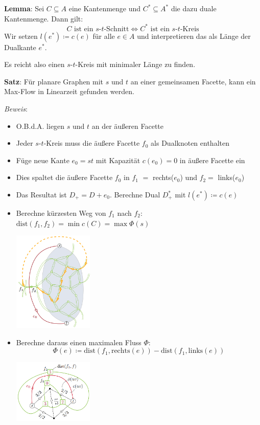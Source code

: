 \textbf{Lemma}: Sei $C\subseteq A$ eine Kantenmenge und $C^*\subseteq A^*$ die dazu duale Kantenmenge. Dann gilt:
$$C \text{ ist ein }s\text{-}t\text{-Schnitt}\iff C^* \text{ ist ein }s\text{-}t\text{-Kreis}$$
Wir setzen $l(e^*)\coloneqq c(e)$ für alle $e\in A$ und interpretieren das als Länge der Dualkante $e^*$.

Es reicht also einen $s$-$t$-Kreis mit minimaler Länge zu finden. 

\textbf{Satz}: Für planare Graphen mit $s$ und $t$ an einer gemeinsamen Facette, kann ein Max-Flow in Linearzeit gefunden werden.

\textit{Beweis}:
\begin{itemize}
	\item O.B.d.A. liegen $s$ und $t$ an der äußeren Facette
	\item Jeder $s$-$t$-Kreis muss die äußere Facette $f_0$ als Dualknoten enthalten
	\item Füge neue Kante $e_0=st$ mit Kapazität $c(e_0)=0$ in äußere Facette ein
	\item Dies spaltet die äußere Facette $f_0$ in $f_1$ $=$ rechts($e_0$) und $f_2 =$ links($e_0$)
	\item Das Resultat ist $D_+=D+e_0$. Berechne Dual $D_+^*$ mit $l(e^*)\coloneqq c(e)$
	\item Berechne kürzesten Weg von $f_1$ nach $f_2$: $\text{dist}(f_1,f_2)=\min c(C)=\max\Phi(s)$
	\begin{center}
		\includegraphics[width=0.3\textwidth]{images/max-flow-1.png}
	\end{center}
	\item Berechne daraus einen maximalen Fluss $\Phi$:
	$$\Phi(e)\coloneqq\text{dist}(f_1,\text{rechts}(e))-\text{dist}(f_1,\text{links}(e))$$
	\begin{center}
		\includegraphics[width=0.3\textwidth]{images/max-flow-2.png}

\end{center}
\end{itemize}
